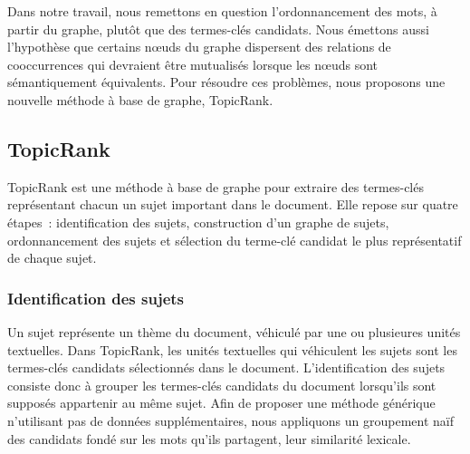    Dans notre travail, nous remettons en question l'ordonnancement des mots,
    à partir du graphe, plutôt que des termes-clés candidats. Nous émettons
    aussi l'hypothèse que certains n\oe{}uds du graphe dispersent des relations
    de cooccurrences qui devraient être mutualisés lorsque les n\oe{}uds sont
    sémantiquement équivalents. Pour résoudre ces problèmes, nous proposons une
    nouvelle méthode à base de graphe, TopicRank.

    \subsection{TopicRank}
    \label{subsec:main:domain_independent_keyphrase_extraction-unsupervised_automatic_keyphrase_extraction-topicrank}
      TopicRank est une méthode à base de graphe pour extraire des termes-clés
      représentant chacun un sujet important dans le document.
      Elle repose sur quatre étapes~: identification des sujets, construction
      d'un graphe de sujets, ordonnancement des sujets et sélection du terme-clé
      candidat le plus représentatif de chaque sujet.

      \subsubsection{Identification des sujets}
      \label{subsubsec:main:domain_independent_keyphrase_extraction-unsupervised_automatic_keyphrase_extraction-topicrank-topic_identification}
        Un sujet représente un thème du document, véhiculé par une ou plusieures
        unités textuelles. Dans TopicRank, les unités textuelles qui véhiculent
        les sujets sont les termes-clés candidats sélectionnés dans le document.
%
%
        L'identification des sujets consiste donc à grouper les termes-clés
        candidats du document lorsqu'ils sont supposés appartenir au même sujet.
        Afin de proposer une méthode générique n'utilisant pas de données
        supplémentaires, nous appliquons un groupement \og{}naïf\fg{} des
        candidats fondé sur les mots qu'ils partagent, leur similarité lexicale.

